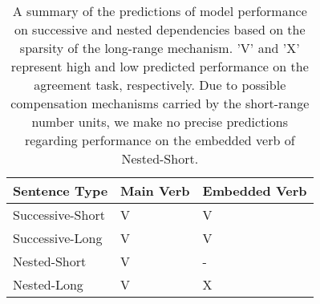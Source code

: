 \begin{center}
\begin{table}
\centering
\begin{tabular}{|P{3.5cm}||P{3.5cm}|P{3.5cm}|}
    \hline
    \B Sentence Type & \B Main Verb & \B Embedded Verb \\
    \hline
    Successive-Short & V  & V \\
    \hline
    Successive-Long & V & V \\
    \hline
    Nested-Short & V & - \\
    \hline
    Nested-Long & V & X \\
    \hline
\end{tabular}
\caption{A summary of the predictions of model performance on successive and nested dependencies based on the sparsity of the long-range mechanism. 'V' and 'X' represent high and low predicted performance on the agreement task, respectively. Due to possible compensation mechanisms carried by the short-range number units, we make no precise predictions regarding performance on the embedded verb of Nested-Short.}
\label{tbl:predictions}
\end{table}
\end{center}